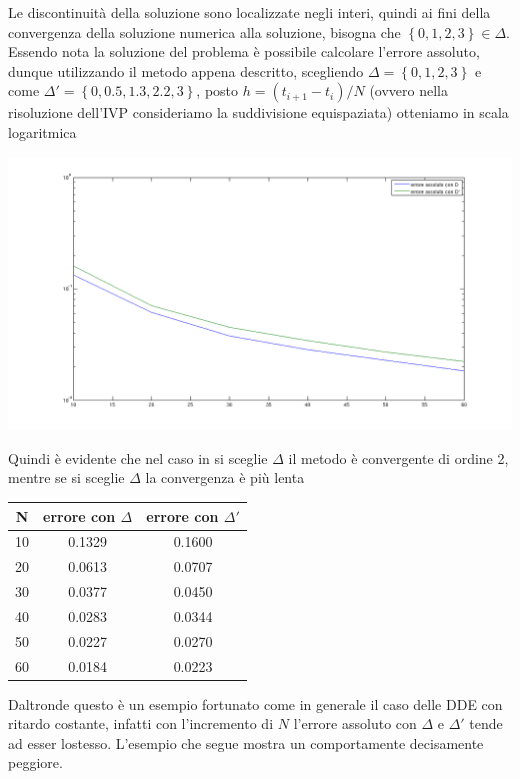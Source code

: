 \begin{exm}
Le discontinuità della soluzione sono localizzate negli interi, quindi ai fini della convergenza della soluzione numerica alla 
soluzione, bisogna che $ \left \{ 0,1,2,3 \right \} \in \Delta$.\vspace{0.5cm}\\
Essendo nota la soluzione del problema è possibile calcolare l'errore assoluto, dunque utilizzando il metodo appena descritto, scegliendo 
$\Delta= \left \{ 0 , 1 , 2 , 3 \right \}$ e come $\Delta'= \left \{ 0 , 0.5 , 1.3 , 2.2 , 3 \right \}$, posto $h=(t_{i+1}-t_i)/N$ (ovvero 
nella risoluzione dell'IVP consideriamo la suddivisione equispaziata) otteniamo in scala logaritmica

\begin{center}
\includegraphics[width=15cm]{immagini/immagine10.png}
\end{center}

Quindi è evidente che nel caso in si sceglie $\Delta$ il metodo è convergente di ordine 2, mentre se si sceglie $\Delta$ la convergenza è più lenta
\begin{center}
\begin{tabular}{|c|c|c|}
\hline
 N	&	errore con $\Delta$	&	errore con $\Delta'$	\\
\hline
10	&	0.1329			&	0.1600			\\
\hline
20	&	0.0613			&	0.0707			\\
\hline
30	&	0.0377			&	0.0450			\\
\hline
40	&	0.0283			&	0.0344			\\
\hline
50	&	0.0227			&	0.0270			\\
\hline
60	&	0.0184			&	0.0223			\\
\hline
\end{tabular}
\end{center}

Daltronde questo è un esempio fortunato come in generale il caso delle DDE con ritardo costante, infatti con l'incremento di $N$ l'errore assoluto 
con $\Delta$ e $\Delta'$ tende ad esser lostesso. L'esempio che segue mostra un comportamente decisamente peggiore.
\end{exm}
